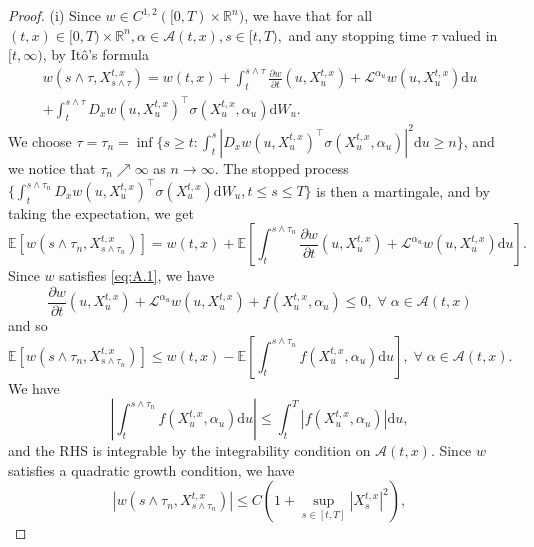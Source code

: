 \begin{proof}
    (i) Since $w\in C^{1,2}([0,T)\times\mathbb{R}^n)$, we have that for all $(t,x)
    \in[0,T)\times\mathbb{R}^n,\alpha\in\mathcal{A}(t,x),s\in[t,T),$ and any stopping
    time $\tau$ valued in $[t,\infty)$, by It\^{o}'s formula
    \begin{multline*}
        w(s\wedge\tau,X_{s\wedge\tau}^{t,x})=w(t,x)+\int_t^{s\wedge\tau}\frac{\partial w}{\partial t}(u,X_u^{t,x})+\mathcal{L}^{\alpha_u}w(u,X_u^{t,x})\mathrm du\\
        +\int_t^{s\wedge\tau}D_xw(u,X_u^{t,x})^\top\sigma(X_u^{t,x},\alpha_u)\mathrm dW_u.
    \end{multline*}
    We choose $\tau=\tau_n=\inf\{s\geq t:\int_t^s|D_xw(u,X_u^{t,x})^\top\sigma(X_u^{t,x},\alpha_u)|^2\mathrm du\geq n\}$,
    and we notice that $\tau_n\nearrow\infty$ as $n\rightarrow\infty$.
    The stopped process $\{\int_t^{s\wedge\tau_n}D_xw(u,X_u^{t,x})^\top\sigma(X_u^{t,x})\mathrm dW_u,t\leq s\leq T\}$
    is then a martingale, and by taking the expectation, we get 
    \begin{equation*}
        \mathbb{E}[w(s\wedge\tau_n,X_{s\wedge\tau_n}^{t,x})]=w(t,x)+\mathbb{E}\left[\int_t^{s\wedge\tau_n}\frac{\partial w}{\partial t}(u,X_u^{t,x})+\mathcal{L}^{\alpha_u}w(u,X_u^{t,x})\mathrm du\right].
    \end{equation*}
    Since $w$ satisfies \eqref{eq:A.1}, we have
    \begin{equation*}
        \frac{\partial w}{\partial t}(u,X_u^{t,x})+\mathcal{L}^{\alpha_u}w(u,X_u^{t,x})+f(X_u^{t,x},\alpha_u)\leq0,\;\forall\;\alpha\in\mathcal{A}(t,x)
    \end{equation*}
    and so
    \begin{equation}\label{eq:A.4}
        \mathbb{E}[w(s\wedge\tau_n,X_{s\wedge\tau_n}^{t,x})]\leq w(t,x)-\mathbb{E}\left[\int_t^{s\wedge\tau_n}f(X_u^{t,x},\alpha_u)\mathrm du\right],\;\forall\;\alpha\in\mathcal{A}(t,x).
    \end{equation}
    We have 
    \begin{equation*}
        \left|\int_t^{s\wedge\tau_n}f(X_u^{t,x},\alpha_u)\mathrm du\right|\leq\int_t^T|f(X_u^{t,x},\alpha_u)|\mathrm du,
    \end{equation*}
    and the RHS is integrable by the integrability condition on $\mathcal{A}(t,x)$.
    Since $w$ satisfies a quadratic growth condition, we have 
    \begin{equation*}
        |w(s\wedge\tau_n,X_{s\wedge\tau_n}^{t,x})|\leq C(1+\sup_{s\in[t,T]}|X_s^{t,x}|^2),

\end{equation*}
\end{proof}
